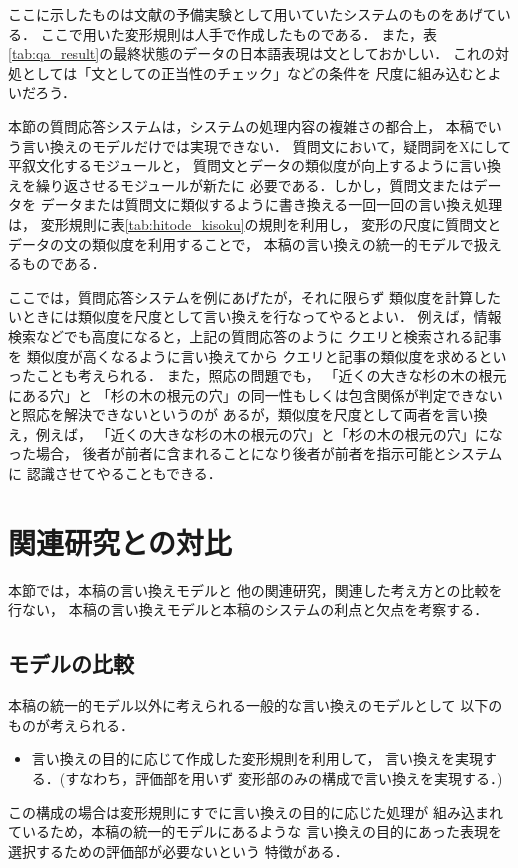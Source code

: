 ここに示したものは文献\cite{murata2000_1_nl}の予備実験として用いていたシステムのものをあげている．
ここで用いた変形規則は人手で作成したものである．
また，表\ref{tab:qa_result}の最終状態のデータの日本語表現は文としておかしい．
これの対処としては「文としての正当性のチェック」などの条件を
尺度に組み込むとよいだろう．

本節の質問応答システムは，システムの処理内容の複雑さの都合上，
本稿でいう言い換えのモデルだけでは実現できない．
質問文において，疑問詞をXにして平叙文化するモジュールと，
質問文とデータの類似度が向上するように言い換えを繰り返させるモジュールが新たに
必要である．しかし，質問文またはデータを
データまたは質問文に類似するように書き換える一回一回の言い換え処理は，
変形規則に表\ref{tab:hitode_kisoku}の規則を利用し，
変形の尺度に質問文とデータの文の類似度を利用することで，
本稿の言い換えの統一的モデルで扱えるものである．

ここでは，質問応答システムを例にあげたが，それに限らず
類似度を計算したいときには類似度を尺度として言い換えを行なってやるとよい．
例えば，情報検索などでも高度になると，上記の質問応答のように
クエリと検索される記事を
類似度が高くなるように言い換えてから
クエリと記事の類似度を求めるといったことも考えられる．
また，照応の問題\cite{murata_noun_nlp}でも，
「近くの大きな杉の木の根元にある穴」と
「杉の木の根元の穴」の同一性もしくは包含関係が判定できないと照応を解決できないというのが
あるが，類似度を尺度として両者を言い換え，例えば，
「近くの大きな杉の木の根元の穴」と「杉の木の根元の穴」になった場合，
後者が前者に含まれることになり後者が前者を指示可能とシステムに
認識させてやることもできる．

\section{関連研究との対比}

本節では，本稿の言い換えモデルと
他の関連研究，関連した考え方との比較を行ない，
本稿の言い換えモデルと本稿のシステムの利点と欠点を考察する．

\subsection{モデルの比較}

本稿の統一的モデル以外に考えられる一般的な言い換えのモデルとして
以下のものが考えられる．
\begin{itemize}
\item 
  言い換えの目的に応じて作成した変形規則を利用して，
  言い換えを実現する．(すなわち，評価部を用いず
  変形部のみの構成で言い換えを実現する．)
\end{itemize}
この構成の場合は変形規則にすでに言い換えの目的に応じた処理が
組み込まれているため，本稿の統一的モデルにあるような
言い換えの目的にあった表現を選択するための評価部が必要ないという
特徴がある．

